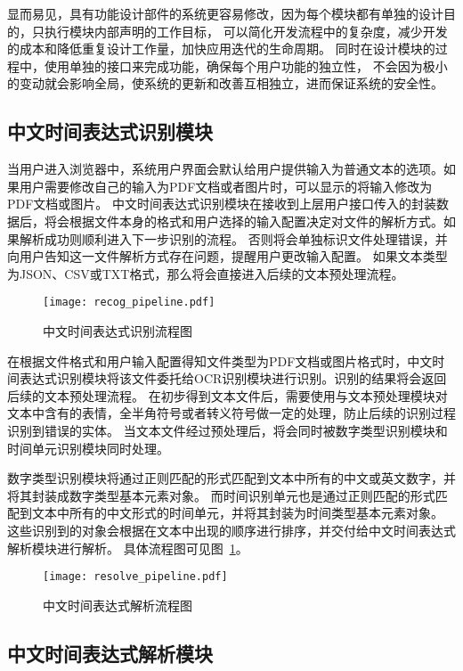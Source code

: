 显而易见，具有功能设计部件的系统更容易修改，因为每个模块都有单独的设计目的，只执行模块内部声明的工作目标，
可以简化开发流程中的复杂度，减少开发的成本和降低重复设计工作量，加快应用迭代的生命周期。
同时在设计模块的过程中，使用单独的接口来完成功能，确保每个用户功能的独立性，
不会因为极小的变动就会影响全局，使系统的更新和改善互相独立，进而保证系统的安全性。


\subsection{中文时间表达式识别模块}

当用户进入浏览器中，系统用户界面会默认给用户提供输入为普通文本的选项。如果用户需要修改自己的输入为PDF文档或者图片时，可以显示的将输入修改为PDF文档或图片。
中文时间表达式识别模块在接收到上层用户接口传入的封装数据后，将会根据文件本身的格式和用户选择的输入配置决定对文件的解析方式。如果解析成功则顺利进入下一步识别的流程。
否则将会单独标识文件处理错误，并向用户告知这一文件解析方式存在问题，提醒用户更改输入配置。
如果文本类型为JSON、CSV或TXT格式，那么将会直接进入后续的文本预处理流程。

\begin{figure}[h]
  \centering
  \texttt{[image: recog\_pipeline.pdf]}
  \caption{中文时间表达式识别流程图}
  \label{fig:recog_pipeline}
\end{figure}

在根据文件格式和用户输入配置得知文件类型为PDF文档或图片格式时，中文时间表达式识别模块将该文件委托给OCR识别模块进行识别。识别的结果将会返回后续的文本预处理流程。
在初步得到文本文件后，需要使用与文本预处理模块对文本中含有的表情，全半角符号或者转义符号做一定的处理，防止后续的识别过程识别到错误的实体。
当文本文件经过预处理后，将会同时被数字类型识别模块和时间单元识别模块同时处理。

数字类型识别模块将通过正则匹配的形式匹配到文本中所有的中文或英文数字，并将其封装成数字类型基本元素对象。
而时间识别单元也是通过正则匹配的形式匹配到文本中所有的中文形式的时间单元，并将其封装为时间类型基本元素对象。
这些识别到的对象会根据在文本中出现的顺序进行排序，并交付给中文时间表达式解析模块进行解析。
具体流程图可见图~\ref{fig:recog_pipeline}。

\begin{figure}[h]
  \centering
  \texttt{[image: resolve\_pipeline.pdf]}
  \caption{中文时间表达式解析流程图}
  \label{fig:resolve_pipeline}
\end{figure}

\subsection{中文时间表达式解析模块}

